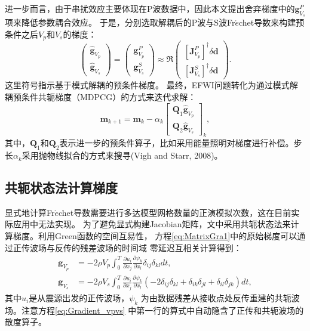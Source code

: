 进一步而言，由于串扰效应主要体现在P波数据中，因此本文提出舍弃梯度中的$\mathbf{g}_{V_s}^P$项来降低参数耦合效应。
于是，分别选取解耦后的P波与S波Fr{$\acute{e}$}chet导数来构建预条件之后$V_p$和$V_s$的梯度：
\begin{equation}
        \begin{pmatrix}
                \hat{\mathbf{g}}_{V_p}\\
                \hat{\mathbf{g}}_{V_s}
        \end{pmatrix}=
        \begin{pmatrix}
                \mathbf{g}_{V_p}^P\\
                \mathbf{g}_{V_s}^S
        \end{pmatrix}
        \approx 
        \mathfrak{R}\begin{pmatrix}
                [\mathbf{J}^P_{V_p}]^{\dagger} \delta \mathbf{d}\\
                [\mathbf{J}^S_{V_s}]^{\dagger} \delta \mathbf{d}
        \end{pmatrix}.
        \label{eq:MatrixGraMode}
\end{equation}
这里符号$\hat{}$指示基于模式解耦的预条件梯度。
最终，EFWI问题转化为通过模式解耦预条件共轭梯度（MDPCG）的方式来迭代求解：
\begin{equation}
        \mathbf{m}_{k+1}=\mathbf{m}_{k}-\alpha_k
        \begin{bmatrix}\mathbf{Q}_1\hat{\mathbf{g}}_{V_p}\\\mathbf{Q}_2\hat{\mathbf{g}}_{V_s}\end{bmatrix}_{k},
        \label{eq:Gradientmethod}
\end{equation}
其中，$\mathbf{Q}_1$和$\mathbf{Q}_2$表示进一步的预条件算子，比如采用能量照明对梯度进行补偿。步长$\alpha_k$采用抛物线拟合的方式来搜寻(Vigh
and Starr, 2008\cite[]{vigh20083d})。

\subsection{共轭状态法计算梯度}
显式地计算Fr{$\acute{e}$}chet导数需要进行多达模型网格数量的正演模拟次数，这在目前实际应用中无法实现\cite[]{virieux2009overview}。
为了避免显式构建Jacobian矩阵，文中采用共轭状态法来计算梯度\cite[]{tromp2005seismic,plessix2006}。利用Green函数的空间互易性，
方程\eqref{eq:MatrixGra1}中的原始梯度可以通过正传波场与反传的残差波场的时间域
零延迟互相关计算得到：
\begin{equation} 
        \begin{split}
        \mathbf{g}_{V_p}&=-2\rho V_p\int_{0}^{T}\frac{\partial u_i}{\partial
        x_j}\frac{\partial \psi_k}{\partial x_l}
        \delta_{ij}\delta_{kl}dt,\\
        \mathbf{g}_{V_s}&=-2\rho V_s\int_{0}^{T}\frac{\partial u_i}{\partial
        x_j}\frac{\partial \psi_k}{\partial x_l}
        (-2\delta_{ij}\delta_{kl}+\delta_{ik}\delta_{jl}+\delta_{il}\delta_{jk})dt,
        \end{split}
        \label{eq:Gradient_vpvs}
\end{equation}
其中$u_i$是从震源出发的正传波场，$\psi_k$ 为由数据残差从接收点处反传重建的共轭波场。注意方程\eqref{eq:Gradient_vpvs}
中第一行的算式中自动隐含了正传和共轭波场的散度算子。

